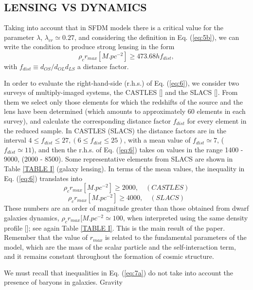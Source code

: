 \documentclass{article}
\begin{document}
\begin{multicols}{2}
\section{LENSING VS DYNAMICS}
Taking into account that in SFDM models there is a
critical value for the parameter $\lambda$, $\lambda_{cr}\simeq 0.27$, and considering
the definition in Eq. (\ref{eq:5b}), we can write the condition
to produce strong lensing in the form
\begin{equation} \label{eq:6}
\rho_cr_{max}[M.pc^{-2}]\geq473.68hf_{dist},
\end{equation}
with $f_{dist}\equiv d_{OS}/d_{OL}d_{LS}$ a distance factor.\par
In order to evaluate the right-hand-side (r.h.s.) of
Eq. (\ref{eq:6}), we consider two surveys of multiply-imaged systems,
the CASTLES [\cite{19}] and the SLACS [\cite{20}]. From
them we select only those elements for which the redshifts
of the source and the lens have been determined
(which amounts to approximately 60 elements in each
survey), and calculate the corresponding distance factor
$f_{dist}$ for every element in the reduced sample. In
CASTLES (SLACS) the distance factors are in the interval
$4\leq f_{dist}\leq27, (6\leq f_{dist}\leq 25)$, with a mean value
of $f_{dist}\simeq7$, ($f_{dist}\simeq11$), and then the r.h.s. of Eq. (\ref{eq:6})
takes on values in the range 1400 - 9000, (2000 - 8500).
Some representative elements from SLACS are shown in
Table \ref{TABLE I} (galaxy lensing). In terms of the mean values,
the inequality in Eq. (\ref{eq:6}) translates into
\begin{equation} \label{eq:7a}
\rho_cr_{max}[M.pc^{-2}]\geq 2000, \quad (CASTLES)
\end{equation}
\begin{equation} \label{eq:7b}
\rho_cr_{max}[M.pc^{-2}]\geq 4000, \quad (SLACS)
\end{equation}
These numbers are an order of magnitude greater
than those obtained from dwarf galaxies dynamics,
$\rho_cr_{max}[M.pc^{-2}\simeq100$, when interpreted using the same
density profile [\cite{7}]; see again Table \ref{TABLE I}. This is the main result
of the paper. Remember that the value of $r_{max}$ is related
to the fundamental parameters of the model, which
are the mass of the scalar particle and the self-interaction
term, and it remains constant throughout the formation
of cosmic structure.\par
We must recall that inequalities in Eq. (\ref{eq:7a}) do not take
into account the presence of baryons in galaxies. Gravity

\end{multicols}
\end{document}
